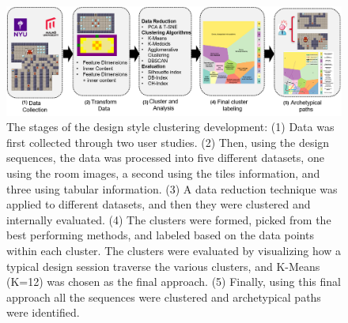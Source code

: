 
\begin{figure}[t!]
\centerline{\includegraphics[width=\textwidth]{figures/figure1.png}}
\caption{The stages of the design style clustering development: (1) Data was first collected through two user studies. (2) Then, using the design sequences, the data was processed into five different datasets, one using the room images, a second using the tiles information, and three using tabular information. (3) A data reduction technique was applied to different datasets, and then they were clustered and internally evaluated. (4) The clusters were formed, picked from the best performing methods, and labeled based on the data points within each cluster. The clusters were evaluated by visualizing how a typical design session traverse the various clusters, and K-Means (K=12) was chosen as the final approach. (5) Finally, using this final approach all the sequences were clustered and archetypical paths were identified.%
} \label{fig:approach-steps}
\end{figure}